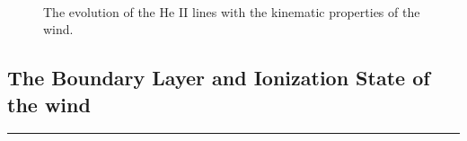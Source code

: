 \documentclass[preprint, a4paper, 11pt]{aastex}
\begin{document}
\begin{figure} %
\mbox{
\quad
{}   
}
\caption{
The evolution of the He II lines with the kinematic properties
of the wind. 
}
\label{jump}
\end{figure}



\subsection{The Boundary Layer and Ionization State of the wind}

\noindent\rule{16cm}{0.4pt}

\end{document}
